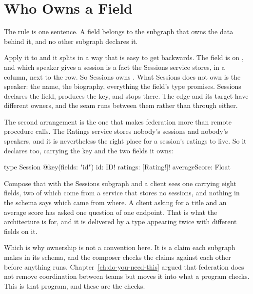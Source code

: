 \section{Who Owns a Field}
\label{sec:ch05-who-owns-a-field}

%
The rule is one sentence. A field belongs to the subgraph that owns the data
behind it, and no other subgraph declares it.

%
Apply it to  and it splits in a way that is easy to get
backwards. The field is on , and which speaker gives a session is
a fact the Sessions service stores, in a column, next to the row. So Sessions
owns . What Sessions does not own is the speaker: the name, the
biography, everything the field's type promises. Sessions declares the field,
produces the key, and stops there. The edge and its target have different
owners, and the seam runs between them rather than through either.

%
The second arrangement is the one that makes federation more than remote
procedure calls. The Ratings service stores nobody's sessions and nobody's
speakers, and it is nevertheless the right place for a session's ratings to
live. So it declares  too, carrying the key and the two fields it
owns:

\begin{graphqlsdl}
type Session @key(fields: "id") {
  id: ID!
  ratings: [Rating!]!
  averageScore: Float
}
\end{graphqlsdl}

%
Compose that with the Sessions subgraph and a client sees one 
carrying eight fields, two of which come from a service that stores no
sessions, and nothing in the schema says which came from where. A client asking
for a title and an average score has asked one question of one endpoint. That
is what the architecture is for, and it is delivered by a type appearing twice
with different fields on it.

%
Which is why ownership is not a convention here. It is a claim each subgraph
makes in its schema, and the composer checks the claims against each other
before anything runs. Chapter~\ref{ch:do-you-need-this} argued that federation
does not remove coordination between teams but moves it into what a program
checks. This is that program, and these are the checks.

